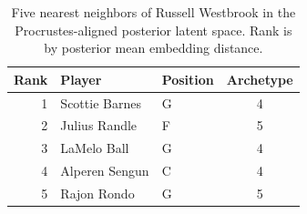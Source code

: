 \begin{table}[htbp]
  \centering\small
  \begin{tabular}{rllc}
    \toprule
    Rank & Player & Position & Archetype \\
    \midrule
    1 & Scottie Barnes & G & 4 \\
    2 & Julius Randle & F & 5 \\
    3 & LaMelo Ball & G & 4 \\
    4 & Alperen Sengun & C & 4 \\
    5 & Rajon Rondo & G & 5 \\
    \bottomrule
  \end{tabular}
  \caption{Five nearest neighbors of Russell Westbrook in the Procrustes-aligned posterior latent space. Rank is by posterior mean embedding distance.}
  \label{tab:Russell_Westbrook_neighbors}
\end{table}

